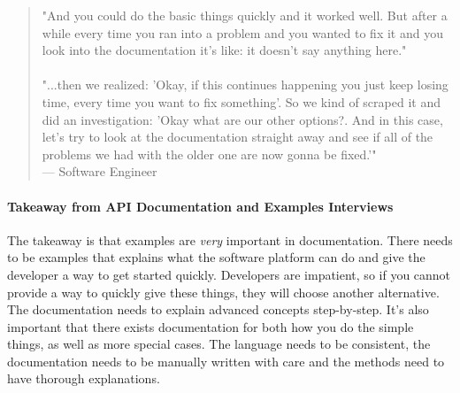 \documentclass{article}
\begin{document}
\begin{quote}
"And you could do the basic things quickly and it worked well. But after a while every time you ran into a problem and you wanted to fix it and you look into the documentation it's like: it doesn't say anything here." \\ \\
"...then we realized: 'Okay, if this continues happening you just keep losing time, every time you want to fix something'. So we kind of scraped it and did an investigation: 'Okay what are our other options?. And in this case, let's try to look at the documentation straight away and see if all of the problems we had with the older one are now gonna be fixed.'" \\
--- Software Engineer
\end{quote}
\paragraph{Takeaway from API Documentation and Examples Interviews}
The takeaway is that examples are \textit{very} important in documentation. There needs to be examples that explains what the software platform can do and give the developer a way to get started quickly. Developers are impatient, so if you cannot provide a way to quickly give these things, they will choose another alternative. The documentation needs to explain advanced concepts step-by-step. It's also important that there exists documentation for both how you do the simple things, as well as more special cases. The language needs to be consistent, the documentation needs to be manually written with care and the methods need to have thorough explanations.
\end{document}
